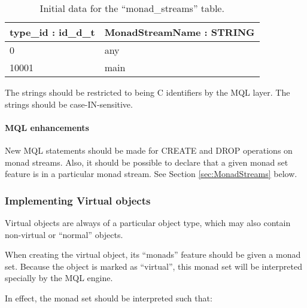 \documentclass[a4paper,12pt]{article}
\begin{document}
\begin{table}[h]
  \begin{center}
  \caption{Initial data for the ``monad\_streams'' table.}
\medskip  
\noindent\begin{tabular}{|l|l|}
\hline
\textbf{type\_id : id\_d\_t} & \textbf{MonadStreamName : STRING}\\
\hline
0  & any \\
\hline
10001 & main \\
\hline
\end{tabular}
  \end{center}
\end{table}


The strings should be restricted to being C identifiers by the MQL
layer.  The strings should be case-IN-sensitive.

\paragraph{MQL enhancements}

New MQL statements should be made for CREATE and DROP operations on
monad streams.  Also, it should be possible to declare that a given
monad set feature is in a particular monad stream.  See Section
\ref{sec:MonadStreams} below.

\subsubsection{Implementing Virtual objects}

Virtual objects are always of a particular object type, which may also
contain non-virtual or ``normal'' objects.

When creating the virtual object, its ``monads'' feature should be
given a monad set.  Because the object is marked as ``virtual'', this
monad set will be interpreted specially by the MQL engine.

In effect, the monad set should be interpreted such that:
\end{document}
